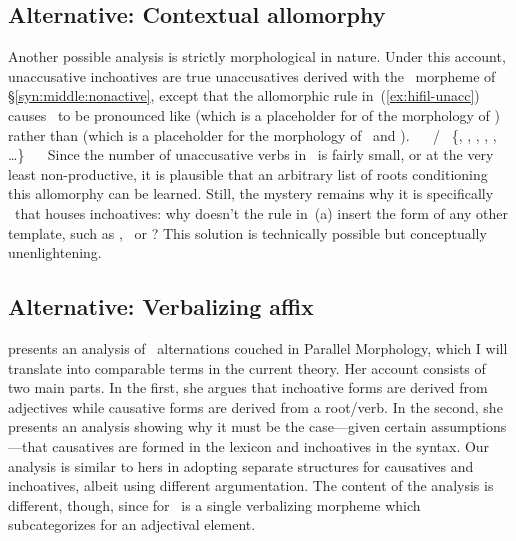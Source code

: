 	\subsection{Alternative: Contextual allomorphy}
Another possible analysis is strictly morphological in nature. Under this account, unaccusative inchoatives are true unaccusatives derived with the \vz~morpheme of \S\ref{syn:middle:nonactive}, except that the allomorphic rule in~(\ref{ex:hifil-unacc}) causes \vz~to be pronounced like  (which is a placeholder for of the morphology of \thif) rather than  (which is a placeholder for the morphology of \tnif~and \thit).
\pex
  \a \vz~\lra~ / \trace~\{, , , , , \dots \}\label{ex:hifil-unacc}
  \a \vz~\lra~
\xe
Since the number of unaccusative verbs in \thif~is fairly small, or at the very least non-productive, it is plausible that an arbitrary list of roots conditioning this allomorphy can be learned. Still, the mystery remains why it is specifically \thif~that houses inchoatives: why doesn't the rule in~(\lastx a) insert the form of any other template, such as \tkal, \tnif~or \tpie? This solution is technically possible but conceptually unenlightening.


	\subsection{Alternative: Verbalizing affix} \label{syn:templates:thif:borer}
\cite{borer91} presents an analysis of \thif~alternations couched in Parallel Morphology, which I will {}translate into {comparable} terms{ in the current theory}. Her account consists of two main parts. In the first, she argues that inchoative forms are derived from adjectives while causative forms are derived from a root/verb. In the second, she presents an analysis showing why it must be the case---given certain assumptions---that causatives are formed in the lexicon and inchoatives in the syntax. Our analysis is similar to hers in adopting separate structures for causatives and inchoatives, albeit using different argumentation. The content of the analysis is different, though, since for \cite{borer91} \thif~is a single verbalizing morpheme which subcategorizes for an adjectival element.

